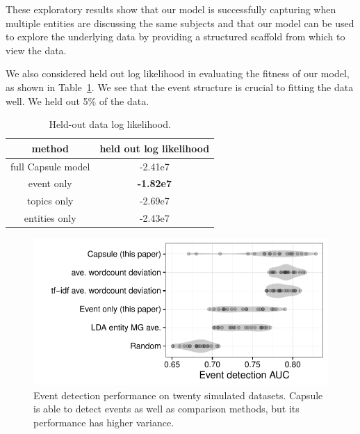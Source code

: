 These exploratory results show that our model is successfully capturing when multiple entities are discussing the same subjects and that our model can be used to explore the underlying data by providing a structured scaffold from which to view the data.

We also considered held out log likelihood in evaluating the fitness of our model, as shown in Table~\ref{tab:loglikelihood}.  We see that the event structure is crucial to fitting the data well.  We held out 5\% of the data.



\begin{table}
\centering
\begin{tabular}{cc}
\toprule
method & held out log likelihood \\
\midrule
full Capsule model & -2.41e7 \\
event only & \textbf{-1.82e7} \\
topics only & -2.69e7 \\
entities only & -2.43e7 \\
\bottomrule
\end{tabular}
\label{tab:loglikelihood}
\caption{Held-out data log likelihood.}
\end{table}


\begin{figure}
\centering
\includegraphics[width=\linewidth]{fig/sim_eventdetect.pdf}
\caption{Event detection performance on twenty simulated datasets.  Capsule is able to detect events as well as comparison methods, but its performance has higher variance.}
\label{fig:sim_eventdetect}
\end{figure}

